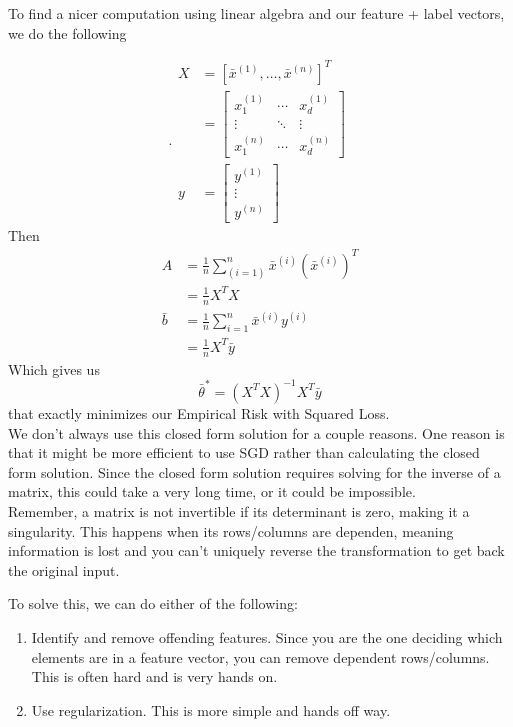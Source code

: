 \documentclass[12pt]{article}
\begin{document}
To find a nicer computation using linear algebra and our feature + label vectors, we do the following 

\[. 
	\begin{aligned}
		X &= [\bar{x}^{(1)}, \dots, \bar{x}^{(n)}]^T\\
			&= 
			\begin{bmatrix}
				x_1^{(1)} & \cdots & x_d^{(1)}\\
				\vdots & \ddots & \vdots\\
				x_1^{(n)} & \cdots & x_d^{(n)}
			\end{bmatrix}\\
		y &= 
		\begin{bmatrix}
			y^{(1)}\\
			\vdots\\
			y^{(n)}
		\end{bmatrix}
	\end{aligned}
\]
Then
\[ 
	\begin{aligned}
		A &= \frac 1 n \sum_{(i=1)}^n \bar{x} ^{(i)} (\bar{x}^{(i)})^T\\
			&= \frac 1 n X^TX\\
		\bar{b} &= \frac 1 n \sum_{i=1}^n \bar{x}^{(i)}y^{(i)}\\
						&= \frac 1 n X^T\bar{y}
	\end{aligned}
\]
Which gives us
\[ 
	\bar{\theta}^* = (X^TX)^{-1}X^T\bar{y}
\]
that exactly minimizes our Empirical Risk with Squared Loss.\\

We don't always use this closed form solution for a couple reasons. One reason is that it might be more efficient to use SGD rather than calculating the closed form solution. Since the closed form solution requires solving for the inverse of a matrix, this could take a very long time, or it could be impossible.\\

Remember, a matrix is not invertible if its determinant is zero, making it a singularity. This happens when its rows/columns are dependen, meaning information is lost and you can't uniquely reverse the transformation to get back the original input.

To solve this, we can do either of the following:

\begin{enumerate}
	\item Identify and remove offending features. Since you are the one deciding which elements are in a feature vector, you can remove dependent rows/columns. This is often hard and is very hands on.
	\item Use regularization. This is more simple and hands off way.
\end{enumerate}
\end{document}
